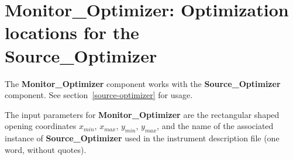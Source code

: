 
\section{Monitor\_Optimizer: Optimization locations for the\\
  Source\_Optimizer}
\label{monitor-optimizer}

The {\bf Monitor\_Optimizer} component works with the {\bf
  Source\_Optimizer} component. See section~\ref{source-optimizer}
for usage.

The input parameters for {\bf Monitor\_Optimizer} are the rectangular
shaped opening coordinates $x_{min}$, $x_{max}$, $y_{min}$,
$y_{max}$, and the name of the associated instance of
{\bf Source\_Optimizer} used in the instrument description file (one word,
without quotes).
